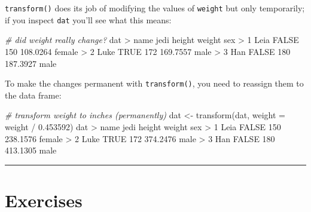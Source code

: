 \documentclass[
]{book}
\newenvironment{Shaded}{\begin{snugshade}}{\end{snugshade}}
\newcommand{\AttributeTok}[1]{\textcolor[rgb]{0.77,0.63,0.00}{#1}}
\newcommand{\CommentTok}[1]{\textcolor[rgb]{0.56,0.35,0.01}{\textit{#1}}}
\newcommand{\ConstantTok}[1]{\textcolor[rgb]{0.00,0.00,0.00}{#1}}
\newcommand{\DecValTok}[1]{\textcolor[rgb]{0.00,0.00,0.81}{#1}}
\newcommand{\FloatTok}[1]{\textcolor[rgb]{0.00,0.00,0.81}{#1}}
\newcommand{\FunctionTok}[1]{\textcolor[rgb]{0.00,0.00,0.00}{#1}}
\newcommand{\NormalTok}[1]{#1}
\newcommand{\OtherTok}[1]{\textcolor[rgb]{0.56,0.35,0.01}{#1}}
\newcommand{\SpecialCharTok}[1]{\textcolor[rgb]{0.00,0.00,0.00}{#1}}
\begin{document}
\texttt{transform()} does its job of modifying the values of \texttt{weight} but only
temporarily; if you inspect \texttt{dat} you'll see what this means:

\begin{Shaded}
\begin{Highlighting}[]
\CommentTok{\# did weight really change?}
\NormalTok{dat}
\SpecialCharTok{\textgreater{}}\NormalTok{   name  jedi height   weight    sex}
\SpecialCharTok{\textgreater{}} \DecValTok{1}\NormalTok{ Leia }\ConstantTok{FALSE}    \DecValTok{150} \FloatTok{108.0264}\NormalTok{ female}
\SpecialCharTok{\textgreater{}} \DecValTok{2}\NormalTok{ Luke  }\ConstantTok{TRUE}    \DecValTok{172} \FloatTok{169.7557}\NormalTok{   male}
\SpecialCharTok{\textgreater{}} \DecValTok{3}\NormalTok{  Han }\ConstantTok{FALSE}    \DecValTok{180} \FloatTok{187.3927}\NormalTok{   male}
\end{Highlighting}
\end{Shaded}

To make the changes permanent with \texttt{transform()}, you need to reassign them
to the data frame:

\begin{Shaded}
\begin{Highlighting}[]
\CommentTok{\# transform weight to inches (permanently)}
\NormalTok{dat }\OtherTok{\textless{}{-}} \FunctionTok{transform}\NormalTok{(dat, }\AttributeTok{weight =}\NormalTok{ weight }\SpecialCharTok{/} \FloatTok{0.453592}\NormalTok{)}
\NormalTok{dat}
\SpecialCharTok{\textgreater{}}\NormalTok{   name  jedi height   weight    sex}
\SpecialCharTok{\textgreater{}} \DecValTok{1}\NormalTok{ Leia }\ConstantTok{FALSE}    \DecValTok{150} \FloatTok{238.1576}\NormalTok{ female}
\SpecialCharTok{\textgreater{}} \DecValTok{2}\NormalTok{ Luke  }\ConstantTok{TRUE}    \DecValTok{172} \FloatTok{374.2476}\NormalTok{   male}
\SpecialCharTok{\textgreater{}} \DecValTok{3}\NormalTok{  Han }\ConstantTok{FALSE}    \DecValTok{180} \FloatTok{413.1305}\NormalTok{   male}
\end{Highlighting}
\end{Shaded}

\begin{center}\rule{0.5\linewidth}{0.5pt}\end{center}

\hypertarget{exercises-6}{%
\section{Exercises}\label{exercises-6}}
\end{document}
